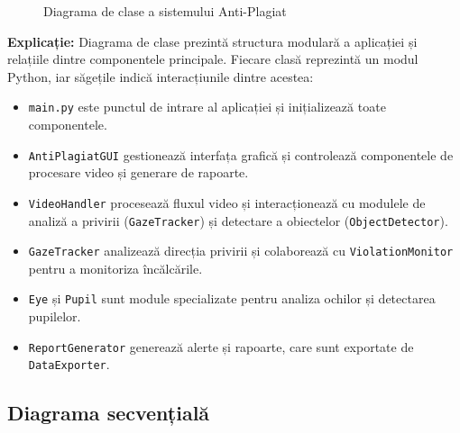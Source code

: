 \documentclass[12pt,a4paper]{article}
\begin{document}
\begin{figure}[H]
    \caption{Diagrama de clase a sistemului Anti-Plagiat}
\end{figure}

\textbf{Explicație:} Diagrama de clase prezintă structura modulară a aplicației și relațiile dintre componentele principale. Fiecare clasă reprezintă un modul Python, iar săgețile indică interacțiunile dintre acestea:
\begin{itemize}
    \item \texttt{main.py} este punctul de intrare al aplicației și inițializează toate componentele.
    \item \texttt{AntiPlagiatGUI} gestionează interfața grafică și controlează componentele de procesare video și generare de rapoarte.
    \item \texttt{VideoHandler} procesează fluxul video și interacționează cu modulele de analiză a privirii (\texttt{GazeTracker}) și detectare a obiectelor (\texttt{ObjectDetector}).
    \item \texttt{GazeTracker} analizează direcția privirii și colaborează cu \texttt{ViolationMonitor} pentru a monitoriza încălcările.
    \item \texttt{Eye} și \texttt{Pupil} sunt module specializate pentru analiza ochilor și detectarea pupilelor.
    \item \texttt{ReportGenerator} generează alerte și rapoarte, care sunt exportate de \texttt{DataExporter}.
\end{itemize}

\subsection{Diagrama secvențială}
\end{document}
